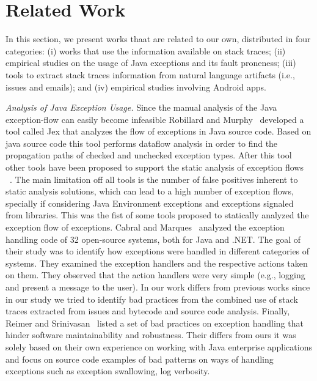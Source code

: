 \documentclass[conference]{IEEEtran}
\begin{document}
\section{Related Work}

In this section, we present works thaat are related to our own, distributed in
four categories: (i) works that use the information available on stack traces;
(ii) empirical studies on the usage of Java exceptions and its fault proneness;
(iii) tools to extract stack traces information from natural language artifacts
(i.e., issues and emails);  and (iv) empirical studies involving Android apps.

\textit{Analysis of Java Exception Usage.} Since the manual analysis of the Java
exception-flow can easily become infeasible Robillard and Murphy~\cite{Robil00}
developed a tool called Jex that analyzes the flow of exceptions in Java source
code. Based on java source code this tool performs dataflow analysis in order to
find the propagation paths of checked and unchecked exception types. After this
tool other tools have been proposed to support the static analysis of exception
flows ~\cite{fu2007exception} ~\cite{coelho2008assessing}. The main limitation
off all tools is the number of false positives inherent to static analysis
solutions, which can lead to a high number of exception flows, specially if
considering Java Environment exceptions and exceptions signaled from libraries.
This was the fist of some tools proposed to statically analyzed the exception
flow of exceptions. Cabral and Marques~\cite{cabral2007exception} analyzed the
exception handling code of 32 open-source systems, both for Java and .NET. The
goal of their study was to identify how exceptions were handled in different
categories of systems. They examined the exception handlers and the respective
actions taken on them. They observed that the action handlers were very simple
(e.g., logging and present a message to the user). In our work differs from
previous works since in our study we tried to identify bad practices from the
combined use of stack traces extracted from issues and bytecode and source code
analysis. Finally, Reimer and Srinivasan~\cite{reimer2003analyzing} listed a set
of bad practices on exception handling that hinder software maintainability and
robustness. Their differs from ours it was solely based on their own experience
on working with Java enterprise applications and focus on source code examples
of bad patterns on ways of handling exceptions such as exception swallowing, log
verbosity.
\end{document}
